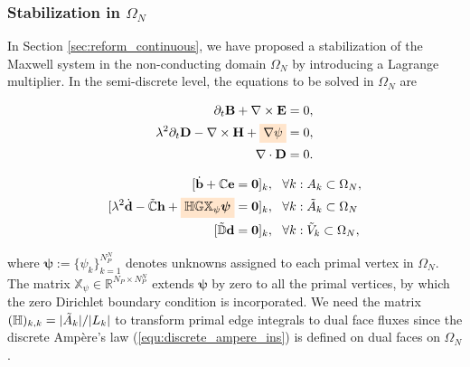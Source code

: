 \documentclass{article}
\begin{document}
\subsubsection{Stabilization in $\Omega_N$} \label{sec:reform-discrete}
In Section \ref{sec:reform_continuous}, we have proposed a stabilization of the Maxwell system in the non-conducting domain $\Omega_N$ by introducing a Lagrange multiplier. In the semi-discrete level, the equations to be solved in $\Omega_N$ are

\begin{center}
    \vspace{-0.5cm}
    \begin{minipage}{0.3\textwidth}
    \begin{align*}
        \partial_t \mathbf{B} + \nabla \times \mathbf{E} &= 0, \\ 
        \lambda^2 \partial_t \mathbf{D} - \nabla \times \mathbf{H} + \colorbox{orange!20}{$\nabla \psi$} &= 0, \\
        \nabla \cdot \mathbf{D} &= 0. 
    \end{align*}
    \end{minipage}
    \begin{minipage}{0.1\textwidth}
    \centering
    \end{minipage}
    \begin{minipage}{0.5\textwidth}
        \begin{subequations}
        \begin{align}
            [\dot{\mathbf{b}} + \mathbb{C}\mathbf{e} &= \mathbf{0}]_k,\ \ \forall k:A_k \subset \Omega_N,\\
            [\lambda^2\dot{\mathbf{d}} - \Tilde{\mathbb{C}}\mathbf{h} + \colorbox{orange!20}{$\mathbb{H} \mathbb{G} \mathbb{X}_\psi \bm{\psi}$}&= \mathbf{0}]_k, \ \ \forall k: \Tilde{A}_k \subset \Omega_N \label{equ:discrete_ampere_ins}\\
            [\Tilde{\mathbb{D}}\mathbf{d} &= \mathbf{0}]_k,\ \ \forall k:\Tilde{V}_k \subset \Omega_N \label{equ:discrete_zero_div}, 
        \end{align} 
    \end{subequations}
    \end{minipage}
\end{center}
where $\bm{\psi} := \{\psi_k\}_{k=1}^{N_P^N}$ denotes unknowns assigned to each primal vertex in $\Omega_N$. The matrix $\mathbb{X}_\psi \in \mathbb{R}^{N_P \times N_P^{N}}$ extends $\bm{\psi}$ by zero to all the primal vertices, by which the zero Dirichlet boundary condition is incorporated. We need the matrix $(\mathbb{H})_{k,k} = {|\Tilde{A}_k|}/{|L_k|}$ to transform primal edge integrals to dual face fluxes since the discrete Amp\`{e}re's law (\ref{equ:discrete_ampere_ins}) is defined on dual faces on $\Omega_N$. 
\end{document}
